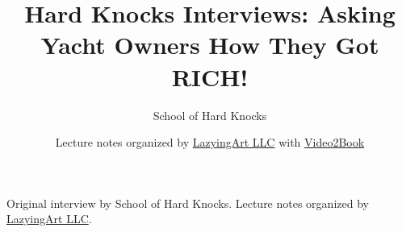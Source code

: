 \documentclass[11pt,oneside]{book}
\begin{document}
\frontmatter
\title{Hard Knocks Interviews: Asking Yacht Owners How They Got RICH!}
\author{School of Hard Knocks}
\date{Lecture notes organized by \href{https://lazying.art}{LazyingArt LLC} with \href{https://github.com/lachlanchen/Video2Book}{Video2Book}}
\maketitle
\begin{center}
\small Original interview by School of Hard Knocks. Lecture notes organized by \href{https://lazying.art}{LazyingArt LLC}.
\end{center}
\clearpage
\mainmatter

\end{document}
